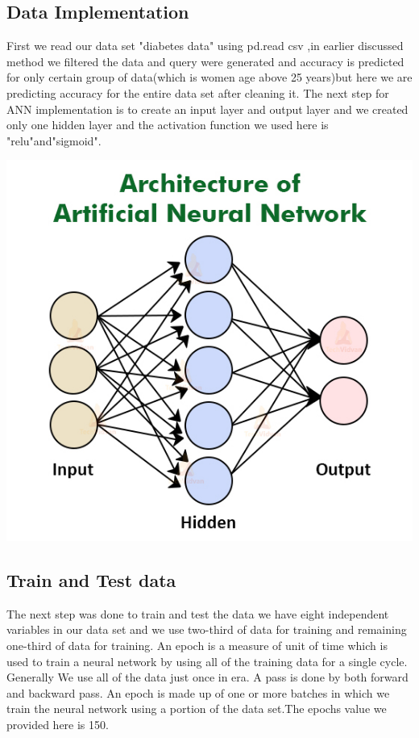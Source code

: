 \documentclass[journal,twoside,web]{ieeecolor}
\begin{document}
\subsection{Data Implementation}
First we read our data set "diabetes data" using pd.read csv ,in earlier discussed method we filtered the data and query were generated and accuracy is predicted for only certain group of data(which is women age above 25 years)but here we are predicting accuracy for the entire data set after cleaning it.
The next step for ANN implementation is to create an input layer and output layer and we created only one hidden layer and the activation function we used here is "relu"and"sigmoid".

\includegraphics[scale=0.3]{ann.jpg}
\label{fig5}

\subsection{Train and Test data}
The next step was done to train and test the data we have eight independent variables in our data set and we use two-third of data for training and remaining one-third of data for training. An epoch is a measure of unit of time which is used to train a neural network by using all of the training data for a single cycle. Generally We use all of the data just once in era. A pass is done by both forward and backward pass. An epoch is made up of one or more batches in which we train the neural network using a portion of the data set.The epochs value we provided here is 150.
\end{document}
